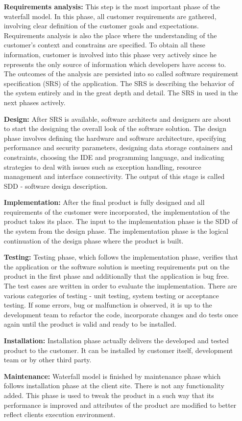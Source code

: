 \documentclass[12pt,final,oneside]{fithesis}
\begin{document}
\begin{itemize}
	\item[\textbf{Requirements analysis:}] This step is the most important phase of the waterfall model. In this phase, all customer requirements are gathered, involving clear definition of the customer goals and expectations. Requirements analysis is also the place where the understanding of the customer's context and constrains are specified. To obtain all these information, customer is involved into this phase very actively since he represents the only source of information which developers have access to. The outcomes of the analysis are persisted into so called software requirement specification (SRS) of the application. The SRS is describing the behavior of the system entirely and in the great depth and detail. The SRS in used in the next phases actively. 
	\item[\textbf{Design:}] After SRS is available, software architects and designers are about to start the designing the overall look of the software solution. The design phase involves defining the hardware and software architecture, specifying performance and security parameters, designing data storage containers and constraints, choosing the IDE and programming language, and indicating strategies to deal with issues such as exception handling, resource management and interface connectivity. The output of this stage is called SDD - software design description.
	\item[\textbf{Implementation:}] After the final product is fully designed and all requirements of the customer were incorporated, the implementation of the product takes its place. The input to the implementation phase is the SDD of the system from the design phase. The implementation phase is the logical continuation of the design phase where the product is built.
	\item[\textbf{Testing:}] Testing phase, which follows the implementation phase, verifies that the application or the software solution is meeting requirements put on the product in the first phase and additionally that the application is bug free. The test cases are written in order to evaluate the implementation. There are various categories of testing - unit testing, system testing or acceptance testing. If some errors, bug or malfunction is observed, it is up to the development team to refactor the code, incorporate changes and do tests once again until the product is valid and ready to be installed.
	\item[\textbf{Installation:}] Installation phase actually delivers the developed and tested product to the customer. It can be installed by customer itself, development team or by other third party.
	\item[\textbf{Maintenance:}] Waterfall model is finished by maintenance phase which follows installation phase at the client site. There is not any functionality added. This phase is used to tweak the product in a such way that its performance is improved and attributes of the product are modified to better reflect clients execution environment. 
\end{itemize}
\end{document}
